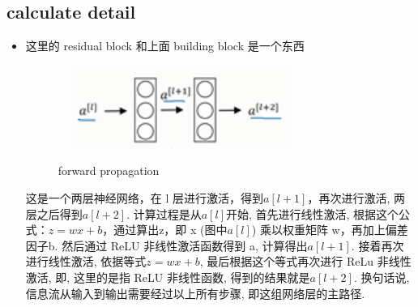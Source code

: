 \documentclass[12pt]{ctexart}%
\begin{document}
		\subsection{\quad calculate detail}
			\begin{itemize}
				\item 这里的 residual block 和上面 building block 是一个东西
						\begin{figure}[H]
							\vspace{-0.2cm}  %
							\setlength{\abovecaptionskip}{-0.2cm}   %
							\centering
							\includegraphics[scale=1.5]{residual_block.png}
							\renewcommand{\figurename}{Fig} %
							\caption{forward propagation}
							\label{fig6:forward ropagation}
						\end{figure}
						这是一个两层神经网络，在 l 层进行激活，得到$a[l+1]$，再次进行激活, 两层之后得到$a[l+2]$. 计算过程是从$a[l]$开始, 首先进行线性激活, 根据这个公式：$z=wx+b$，通过算出z，即 x (图中$a[l]$) 乘以权重矩阵 w，再加上偏差因子b. 然后通过 ReLU 非线性激活函数得到 a, 计算得出$a[l+1]$. 接着再次进行线性激活, 依据等式$z = wx+b$, 最后根据这个等式再次进行 ReLu 非线性激活, 即, 这里的是指 ReLU 非线性函数, 得到的结果就是$a[l+2]$. 换句话说, 信息流从输入到输出需要经过以上所有步骤, 即这组网络层的主路径. 
						

\end{itemize}
\end{document}
